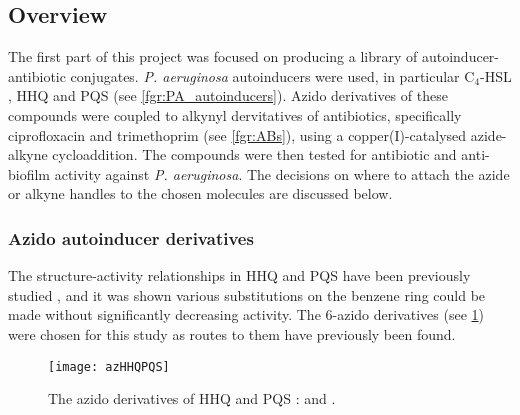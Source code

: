 \subsection{Overview}

The first part of this project was focused on producing a library of autoinducer-antibiotic conjugates. \textit{P. aeruginosa} autoinducers were used, in particular C$_4$-HSL , HHQ  and PQS  (see \ref{fgr:PA_autoinducers}). Azido derivatives of these compounds were coupled to alkynyl dervitatives of antibiotics, specifically ciprofloxacin  and trimethoprim  (see \ref{fgr:ABs}), using a copper(I)-catalysed azide-alkyne cycloaddition\cite{Tornoe2002,Rostovtsev2002}.
The compounds were then tested for antibiotic and anti-biofilm activity against \textit{P. aeruginosa}.
The decisions on where to attach the azide or alkyne handles to the chosen molecules are discussed below.

\subsubsection{Azido autoinducer derivatives}

The structure-activity relationships in HHQ  and PQS  have been previously studied \cite{Lu2012,Lu2014,Hodgkinson2010}, and it was shown various substitutions on the benzene ring could be made without significantly decreasing activity. The 6-azido derivatives (see \ref{fgr:azHHQPQS}) were chosen for this study as routes to them have previously been found\cite{Baker2015}.


\begin{figure}[H]
	\begin{center}
		\texttt{[image: azHHQPQS]}
		\caption{The azido derivatives of HHQ  and PQS :  and . \label{fgr:azHHQPQS}}
	\end{center}
\end{figure}

